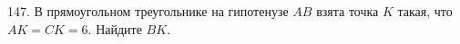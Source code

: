 147. В прямоугольном треугольнике на гипотенузе $AB$ взята точка $K$ такая, что $AK=CK=6.$ Найдите $BK.$\\
